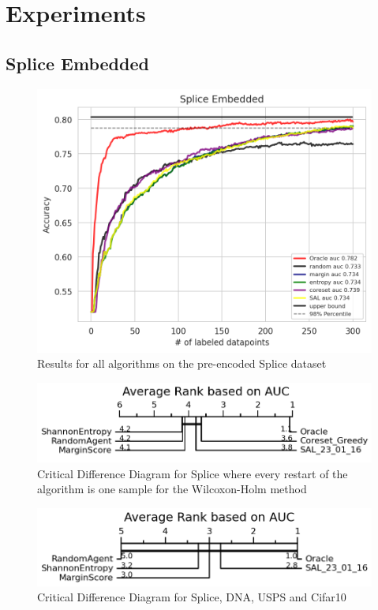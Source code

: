 \documentclass[]{article}
\begin{document}
\section{Experiments}

\subsection{Splice Embedded}
\begin{figure}[H]
	\centering
	\includegraphics[width=0.8\linewidth]{img/eval_splice_embedded}
	\caption{Results for all algorithms on the pre-encoded Splice dataset}
\end{figure}
\begin{figure}[H]
\centering
\includegraphics[width=0.8\linewidth]{img/eval_splice_embedded_cd}
\caption{Critical Difference Diagram for Splice where every restart of the algorithm is one sample for the Wilcoxon-Holm method}
\end{figure}
\begin{figure}[H]
\centering
\includegraphics[width=0.8\linewidth]{img/eval_macro}
\caption{Critical Difference Diagram for Splice, DNA, USPS and Cifar10}
\end{figure}
\end{document}
